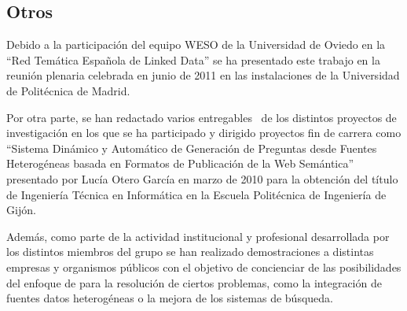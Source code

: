 \subsection{Otros}
Debido a la participación del equipo \gls{WESO} de la Universidad de Oviedo en la ``Red Temática Española
de Linked Data'' se ha presentado este trabajo en la reunión plenaria celebrada en junio de 2011 en las
instalaciones de la Universidad de Politécnica de Madrid. 

Por otra parte, se han redactado varios entregables~\cite{web-personal} de los distintos proyectos de investigación
en los que se ha participado y dirigido proyectos fin de carrera como ``Sistema Dinámico y Automático de Generación de Preguntas desde Fuentes Heterogéneas basada en Formatos de Publicación de la Web Semántica''
presentado por Lucía Otero García en marzo de 2010 para la obtención del título de Ingeniería Técnica en Informática
en la Escuela Politécnica de Ingeniería de Gijón.

Además, como parte de la actividad institucional y profesional desarrollada por los distintos miembros del grupo
se han realizado demostraciones a distintas empresas y organismos públicos con el objetivo de concienciar
de las posibilidades del enfoque de \linkeddata para la resolución de ciertos problemas, como la integración 
de fuentes datos heterogéneas o la mejora de los sistemas de búsqueda.
